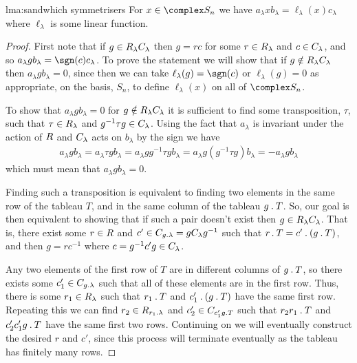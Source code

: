 \begin{lma}{}{lma:sandwhich symmetrisers}
    For \(x \in \complex S_n\) we have \(a_\lambda x b_\lambda = \ell_\lambda(x)c_\lambda\) where \(\ell_\lambda\) is some linear function.
    \begin{proof}
        First note that if \(g \in R_\lambda C_\lambda\) then \(g = rc\) for some \(r \in R_\lambda\) and \(c \in C_\lambda\), and so \(a_\lambda g b_\lambda = \sgn(c) c_\lambda\).
        To prove the statement we will show that if \(g \notin R_\lambda C_\lambda\) then \(a_\lambda g b_\lambda = 0\), since then we can take \(\ell_\lambda(g) = \sgn(c)\) or \(\ell_\lambda(g) = 0\) as appropriate, on the basis, \(S_n\), to define \(\ell_\lambda(x)\) on all of \(\complex S_n\).
        
        To show that \(a_\lambda g b_\lambda = 0\) for \(g \notin R_\lambda C_\lambda\) it is sufficient to find some transposition, \(\tau\), such that \(\tau \in R_\lambda\) and \(g^{-1}\tau g \in C_\lambda\).
        Using the fact that \(a_\lambda\) is invariant under the action of \(R\) and \(C_\lambda\) acts on \(b_\lambda\) by the sign we have
        \begin{align}
            a_\lambda g b_\lambda = a_\lambda \tau g b_\lambda = a_\lambda gg^{-1}\tau gb_\lambda = a_\lambda g(g^{-1}\tau g)b_\lambda = -a_\lambda g b_\lambda
        \end{align}
        which must mean that \(a_\lambda g b_\lambda = 0\).
        
        Finding such a transposition is equivalent to finding two elements in the same row of the tableau \(T\), and in the same column of the tableau \(g \mathbin{.} T\).
        So, our goal is then equivalent to showing that if such a pair doesn't exist then \(g \in R_\lambda C_\lambda\).
        That is, there exist some \(r \in R\) and \(c' \in C_{g \mathbin{.} \lambda} = g C_\lambda g^{-1}\) such that \(r \mathbin{.} T = c' \mathbin{.} (g \mathbin{.} T)\), and then \(g = rc^{-1}\) where \(c = g^{-1}c'g \in C_\lambda\).
        
        Any two elements of the first row of \(T\) are in different columns of \(g \mathbin{.} T\), so there exists some \(c_1' \in C_{g \mathbin{.} \lambda}\) such that all of these elements are in the first row.
        Thus, there is some \(r_1 \in R_\lambda\) such that \(r_1 \mathbin{.} T\) and \(c_1' \mathbin{.} (g \mathbin{.} T)\) have the same first row.
        Repeating this we can find \(r_2 \in R_{r_1 \mathbin{.} \lambda}\) and \(c_2' \in C_{c_1'g \mathbin{.} T}\) such that \(r_2r_1 \mathbin{.} T\) and \(c_2'c_1'g \mathbin{.} T\) have the same first two rows.
        Continuing on we will eventually construct the desired \(r\) and \(c'\), since this process will terminate eventually as the tableau has finitely many rows.
    \end{proof}
\end{lma}

